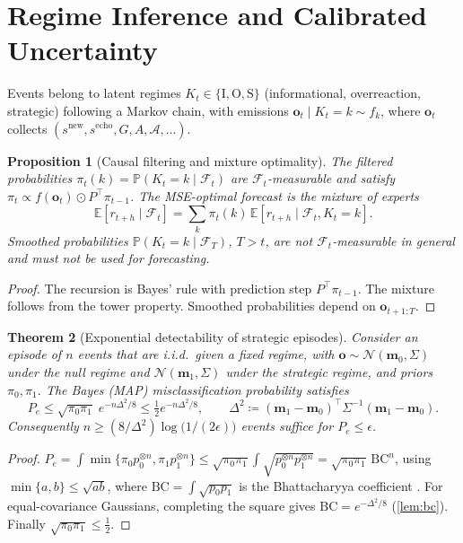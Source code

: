 \documentclass[11pt,a4paper]{article}
\theoremstyle{plain}
\newtheorem{theorem}{Theorem}[section]
\newtheorem{proposition}[theorem]{Proposition}
\theoremstyle{definition}
\theoremstyle{remark}
\newcommand{\E}{\mathbb{E}}
\newcommand{\Prob}{\mathbb{P}}
\newcommand{\N}{\mathcal{N}}
\newcommand{\F}{\mathcal{F}}
\begin{document}
\section{Regime Inference and Calibrated Uncertainty}\label{sec:inference}

Events belong to latent regimes $K_t\in\{\mathrm{I},\mathrm{O},\mathrm{S}\}$ (informational, overreaction, strategic) following a Markov chain, with emissions $\bm o_t\mid K_t=k\sim f_k$, where $\bm o_t$ collects $(s^{\text{new}},s^{\text{echo}},G,A,\mathcal{A},\dots)$.

\begin{proposition}[Causal filtering and mixture optimality]\label{prop:filter}
The filtered probabilities $\pi_t(k)=\Prob(K_t=k\mid\F_t)$ are $\F_t$-measurable and satisfy $\pi_t\propto f(\bm o_t)\odot P^\top\pi_{t-1}$. The MSE-optimal forecast is the mixture of experts
\[
  \E[r_{t+h}\mid\F_t]=\sum_k\pi_t(k)\,\E[r_{t+h}\mid\F_t,K_t=k].
\]
Smoothed probabilities $\Prob(K_t=k\mid\F_T)$, $T>t$, are not $\F_t$-measurable in general and must not be used for forecasting.
\end{proposition}
\begin{proof}
The recursion is Bayes' rule with prediction step $P^\top\pi_{t-1}$. The mixture follows from the tower property. Smoothed probabilities depend on $\bm o_{t+1:T}$.
\end{proof}

\begin{theorem}[Exponential detectability of strategic episodes]\label{thm:detect}
Consider an episode of $n$ events that are i.i.d.\ given a fixed regime, with $\bm o\sim\N(\bm m_0,\Sigma)$ under the null regime and $\N(\bm m_1,\Sigma)$ under the strategic regime, and priors $\pi_0,\pi_1$. The Bayes (MAP) misclassification probability satisfies
\[
  P_e\le\sqrt{\pi_0\pi_1}\;e^{-n\Delta^2/8}\le\tfrac12e^{-n\Delta^2/8},\qquad \Delta^2\coloneqq(\bm m_1-\bm m_0)^\top\Sigma^{-1}(\bm m_1-\bm m_0).
\]
Consequently $n\ge(8/\Delta^2)\log\big(1/(2\epsilon)\big)$ events suffice for $P_e\le\epsilon$.
\end{theorem}
\begin{proof}
$P_e=\int\min\{\pi_0p_0^{\otimes n},\pi_1p_1^{\otimes n}\}\le\sqrt{\pi_0\pi_1}\int\sqrt{p_0^{\otimes n}p_1^{\otimes n}}=\sqrt{\pi_0\pi_1}\,\mathrm{BC}^n$, using $\min\{a,b\}\le\sqrt{ab}$, where $\mathrm{BC}=\int\sqrt{p_0p_1}$ is the Bhattacharyya coefficient \citep{bhattacharyya1943,kailath1967}. For equal-covariance Gaussians, completing the square gives $\mathrm{BC}=e^{-\Delta^2/8}$ (\cref{lem:bc}). Finally $\sqrt{\pi_0\pi_1}\le\tfrac12$.
\end{proof}
\end{document}
